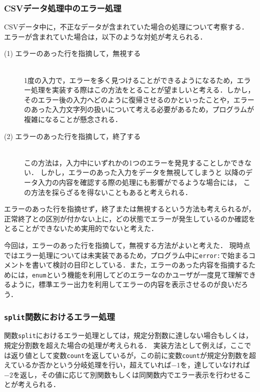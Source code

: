 \documentclass[a4j,11pt]{jarticle}
\begin{document}
\subsubsection{CSVデータ処理中のエラー処理}

CSVデータ中に，不正なデータが含まれていた場合の処理について考察する．
エラーが含まれていた場合は，以下のような対処が考えられる．

\begin{description} %
  \item[(1) エラーのあった行を指摘して，無視する]~\\
1度の入力で，エラーを多く見つけることができるようになるため，エラー処理を実装する際はこの方法をとることが望ましいと考える．しかし，そのエラー後の入力へどのように復帰させるのかといったことや，エラーのあった入力文字列の扱いについて考える必要があるため，プログラムが複雑になることが懸念される．
  \item[(2) エラーのあった行を指摘して，終了する]~\\
    この方法は，入力中にいずれかの1つのエラーを発見することしかできない．
    しかし，エラーのあった入力をデータを無視してしまうと
    以降のデータ入力の内容を確認する際の処理にも影響がでるような場合には，
    この方法を採らざるを得ないこともあると考えられる．
\end{description}

エラーのあった行を指摘せず，終了または無視するという方法も考えられるが，正常終了との区別が付かない上に，どの状態でエラーが発生しているのか確認をとることができないため実用的でないと考えた．

今回は，エラーのあった行を指摘して，無視する方法がよいと考えた．
現時点ではエラー処理については未実装であるため，プログラム中に\verb|error:|で始まるコメントを書いて検討の目印としている．また，エラーのあった内容を指摘するためには，\verb|enum|という機能を利用してどのエラーなのかユーザが一度見て理解できるように，標準エラー出力を利用してエラーの内容を表示させるのが良いだろう．

\subsubsection{\texttt{split}関数におけるエラー処理}
関数\verb|split|におけるエラー処理としては，規定分割数に達しない場合もしくは，規定分割数を超えた場合の処理が考えられる．
実装方法として例えば，ここでは返り値として変数\verb|count|を返しているが，この前に変数\verb|count|が規定分割数を超えているか否かという分岐処理を行い，超えていれば$-1$を，達していなければ$-2$を返し，その値に応じて別関数もしくは同関数内でエラー表示を行わせることが考えられる．
\end{document}
